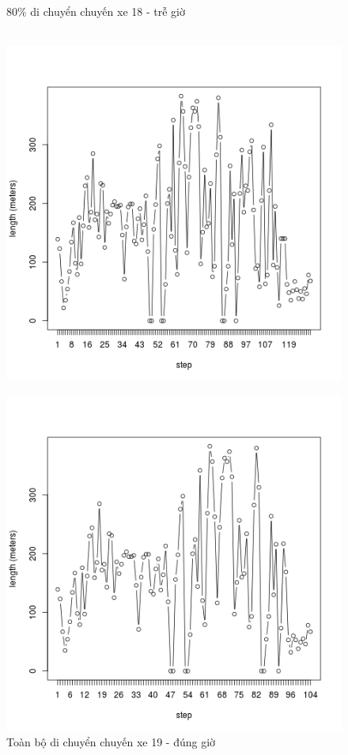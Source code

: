 \documentclass[a4paper, 13pt]{report}
\begin{document}
\begin{figure}[!htb]
  \caption*{80\% di chuyển chuyến xe 18 - trễ giờ}
\endminipage\\
  \includegraphics[width=\linewidth]{test_100_19}
  \caption*{Toàn bộ di chuyển chuyến xe 19 - đúng giờ}
\endminipage
{}
  \includegraphics[width=\linewidth]{test_80_19}

\end{figure}
\end{document}

